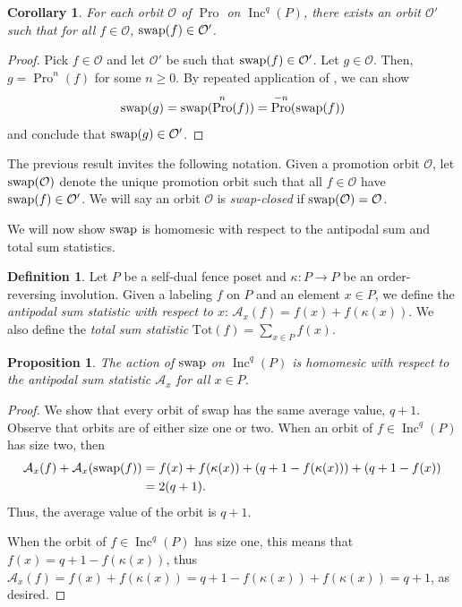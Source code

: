 \documentclass[11pt]{amsart}
\newtheorem{corollary}[theorem]{Corollary}
\newtheorem{proposition}[theorem]{Proposition}
\theoremstyle{definition}
\newtheorem{definition}[theorem]{Definition}
\newcommand{\as}{\mathcal{A}}
\newcommand{\tot}{\mathrm{Tot}}
\DeclareMathOperator{\Inc}{\mathrm{Inc}}
\DeclareMathOperator{\Pro}{\mathrm{Pro}}
\newcommand{\swap}{\textnormal{swap}}
\begin{document}
\begin{corollary}\label{cor:TwoTypesOfOrbits}
For each orbit $\mathcal{O}$ of $\Pro$ on $\Inc^q(P)$, there exists an orbit $\mathcal{O}'$ such that for all $f \in \mathcal{O}$, $\swap(f) \in \mathcal{O}'$. 
\end{corollary}

\begin{proof}
 Pick $f \in \mathcal{O}$ and let $\mathcal{O}'$ be such that $\swap(f) \in \mathcal{O}'$. Let $g \in \mathcal{O}$. Then, $g = \Pro^{n}(f)$ for some $n \geq 0$. By repeated application of , we can show \[
\swap(g) = \swap(\Pro^{n}(f)) = \Pro^{-n}(\swap(f))
\]
and conclude that $\swap(g) \in \mathcal{O}'$.
\end{proof}

 The previous result invites the following notation. Given a promotion orbit $\mathcal{O}$, let $\swap(\mathcal{O})$ denote the unique promotion orbit such that all $f \in \mathcal{O}$ have $\swap(f) \in \mathcal{O}'$. We will say an orbit $\mathcal{O}$ is \emph{swap-closed} if $\swap(\mathcal{O}) = \mathcal{O}$.

We will now show $\swap$ is homomesic with respect to the antipodal sum and total sum statistics.

\begin{definition}\label{def:stats}
    Let $P$ be a self-dual fence poset and $\kappa:P\to P$ be an order-reversing involution. Given a labeling $f$ on $P$ and an element $x\in P$, we define the \emph{antipodal sum statistic with respect to $x$}: $\as_x(f)=f(x)+f(\kappa(x))$.  We also define the \emph{total sum statistic} $\tot(f)=\sum_{x\in P} f(x)$.
\end{definition}

\begin{proposition}\label{prop:swap-homomesy-antipodal}
The action of $\swap$ on $\Inc^q(P)$ is homomesic with respect to the antipodal sum statistic $\as_x$ for all $x\in P$.
\end{proposition}

\begin{proof}
We show that every orbit of swap has the same average value, $q+1$.
Observe that orbits are of either size one or two.
When an orbit of $f\in\Inc^q(P)$ has size two, then 
\begin{align*}
\as_x(f) + \as_x(\swap(f))&= f(x) + f(\kappa(x)) + (q+1-f(\kappa(x))) + (q+1 - f(x)) \\
&= 2(q+1).
\end{align*}
Thus, the average value of the orbit is $q+1$.

When the orbit of $f\in\Inc^q(P)$ has size one, this means that $f(x) = q+1 - f(\kappa(x))$, thus $\as_x(f) = f(x) + f(\kappa(x)) = q+1 - f(\kappa(x)) + f(\kappa(x)) = q+1$, as desired.
\end{proof}
\end{document}
